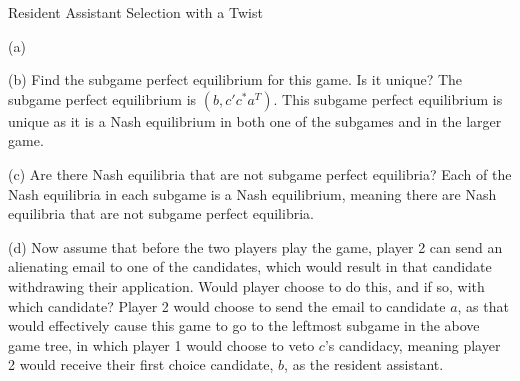 \documentclass[10pt]{extarticle}
\begin{document}
\begin{problem}{Resident Assistant Selection with a Twist}
\begin{problem}{(a)}
\begin{center}
      \end{center}
    \end{problem}
    \begin{problem}{(b)}
      Find the subgame perfect equilibrium for this game. Is it unique?
      \tcblower
      The subgame perfect equilibrium is $(b,c'c^*a^T)$. This subgame perfect equilibrium is unique as it is a Nash equilibrium in both one of the subgames and in the larger game.
    \end{problem}
    \begin{problem}{(c)}
      Are there Nash equilibria that are not subgame perfect equilibria?
      \tcblower
      Each of the Nash equilibria in each subgame is a Nash equilibrium, meaning there are Nash equilibria that are not subgame perfect equilibria.
    \end{problem}
    \begin{problem}{(d)}
      Now assume that before the two players play the game, player 2 can send an alienating email to one of the candidates, which would result in that candidate withdrawing their application. Would player choose to do this, and if so, with which candidate?
      \tcblower
      Player 2 would choose to send the email to candidate $a$, as that would effectively cause this game to go to the leftmost subgame in the above game tree, in which player 1 would choose to veto $c$'s candidacy, meaning player 2 would receive their first choice candidate, $b$, as the resident assistant.
    \end{problem}
  \end{problem}
\end{document}
